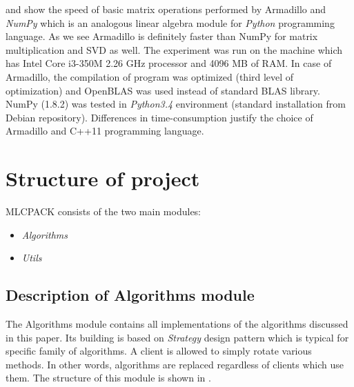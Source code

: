  and  show the speed of basic matrix operations performed by Armadillo and \textit{NumPy} which is an analogous linear algebra module for \textit{Python} programming language. As we see Armadillo is definitely faster than NumPy for matrix multiplication and SVD as well.   
The experiment was run on the machine which has Intel Core i3-350M 2.26 GHz processor and 4096 MB of RAM. In case of Armadillo, the compilation of program was optimized (third level of optimization) and OpenBLAS was used instead of standard BLAS library. NumPy (1.8.2) was tested in \textit{Python3.4} environment (standard installation from Debian repository). Differences in time-consumption justify the choice of Armadillo and C++11 programming language.

\section{Structure of project}

MLCPACK consists of the two main modules:
\begin{itemize}
    \item \textit{Algorithms}
    \item \textit{Utils}
\end{itemize}

\subsection{Description of Algorithms module}

The Algorithms module contains all implementations of the algorithms discussed in this paper. Its building is based on \textit{Strategy} design pattern which is typical for specific family of algorithms. A client is allowed to simply rotate various methods. In other words, algorithms are replaced regardless of clients which use them. The structure of this module is shown in . 

